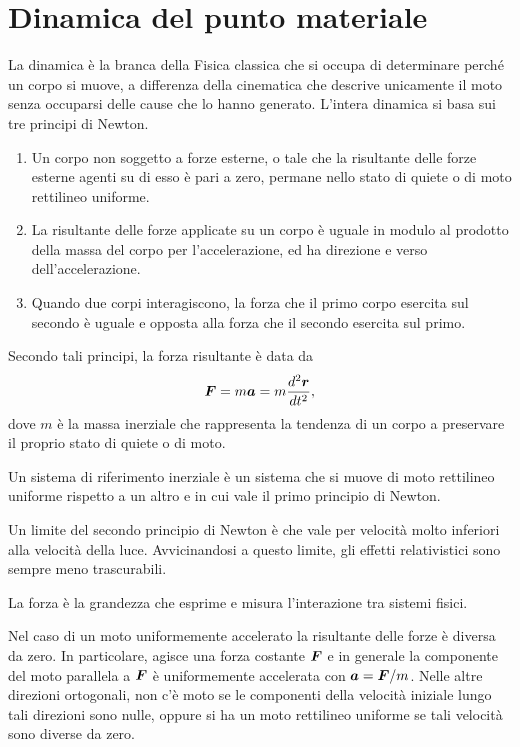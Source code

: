 \chapter{Dinamica del punto materiale}
La dinamica è la branca della Fisica classica che si occupa di determinare perché un corpo si muove, a differenza della cinematica che descrive unicamente il moto senza occuparsi delle cause che lo hanno generato. L'intera dinamica si basa sui tre principi di Newton.
\begin{axiom}\hfill
    \begin{enumerate}
        \item Un corpo non soggetto a forze esterne, o tale che la risultante delle forze esterne agenti su di esso è pari a zero, permane nello stato di quiete o di moto rettilineo uniforme.
        \item La risultante delle forze applicate su un corpo è uguale in modulo al prodotto della massa del corpo per l'accelerazione, ed ha direzione e verso dell'accelerazione.
        \item Quando due corpi interagiscono, la forza che il primo corpo esercita sul secondo è uguale e opposta alla forza che il secondo esercita sul primo.
    \end{enumerate}
\end{axiom}
Secondo tali principi, la forza risultante è data da
\begin{equation}
    \bm{F}=m\bm{a}=m\frac{d^2\bm{r}}{dt^2},
\end{equation}
dove $m$ è la massa inerziale che rappresenta la tendenza di un corpo a preservare il proprio stato di quiete o di moto. 
\begin{defn}
    Un sistema di riferimento inerziale è un sistema che si muove di moto rettilineo uniforme rispetto a un altro e in cui vale il primo principio di Newton.
\end{defn}
\begin{obs}
    Un limite del secondo principio di Newton è che vale per velocità molto inferiori alla velocità della luce. Avvicinandosi a questo limite, gli effetti relativistici sono sempre meno trascurabili. 
\end{obs}
\begin{defn}[forza]
    La forza è la grandezza che esprime e misura l'interazione tra sistemi fisici.
\end{defn}
Nel caso di un moto uniformemente accelerato la risultante delle forze è diversa da zero. In particolare, agisce una forza costante $\bm{F}$ e in generale la componente del moto parallela a $\bm{F}$ è uniformemente accelerata con $\bm{a}=\bm{F}/m$. Nelle altre direzioni ortogonali, non c'è moto se le componenti della velocità iniziale lungo tali direzioni sono nulle, oppure si ha un moto rettilineo uniforme se tali velocità sono diverse da zero.

